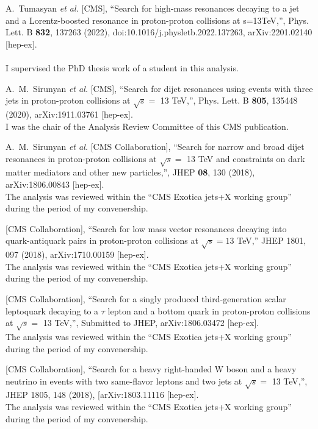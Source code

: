 \documentclass[10pt, a4paper]{article}
\begin{document}
\begin{thebibliography}{599}

A.~Tumasyan \textit{et al.} [CMS],
``Search for high-mass resonances decaying to a jet and a
Lorentz-boosted resonance in proton-proton collisions at s=13TeV,'',
Phys. Lett. B \textbf{832}, 137263 (2022),
doi:10.1016/j.physletb.2022.137263, arXiv:2201.02140 [hep-ex].\\
\\ I supervised the PhD thesis work of a student in this analysis.

A.~M.~Sirunyan \textit{et al.} [CMS],
``Search for dijet resonances using events with three jets in
proton-proton collisions at $\sqrt{s} =$ 13 TeV,'', Phys. Lett. B
\textbf{805}, 135448 (2020), arXiv:1911.03761 [hep-ex]. \\
I was the chair of the Analysis Review Committee of this CMS publication.

  A.~M.~Sirunyan {\it et al.} [CMS Collaboration],
  ``Search for narrow and broad dijet resonances in proton-proton
  collisions at $\sqrt{s}=$ 13 TeV and constraints on dark matter
  mediators and other new particles,'', JHEP \textbf{08}, 130 (2018), arXiv:1806.00843 [hep-ex]. \\
The analysis was reviewed within the ``CMS Exotica jets+X working
group'' during the period of my convenership.

  [CMS Collaboration],
  ``Search for low mass vector resonances decaying into quark-antiquark pairs in proton-proton collisions at $ \sqrt{s}=13 $ TeV,''
  JHEP 1801, 097 (2018), arXiv:1710.00159 [hep-ex].\\
The analysis was reviewed within the ``CMS Exotica jets+X working
group'' during the period of my convenership.

 [CMS Collaboration],
  ``Search for a singly produced third-generation scalar leptoquark
  decaying to a $\tau$ lepton and a bottom quark in proton-proton
  collisions at $\sqrt{s} =$ 13 TeV,'', Submitted to JHEP, arXiv:1806.03472 [hep-ex]. \\
The analysis was reviewed within the ``CMS Exotica jets+X working
group'' during the period of my convenership.

 [CMS Collaboration],
  ``Search for a heavy right-handed W boson and a heavy neutrino in
  events with two same-flavor leptons and two jets at $\sqrt{s}=$ 13
  TeV,'', JHEP 1805, 148 (2018), [arXiv:1803.11116 [hep-ex]. \\
The analysis was reviewed within the ``CMS Exotica jets+X working
group'' during the period of my convenership.


\end{thebibliography}
\end{document}

